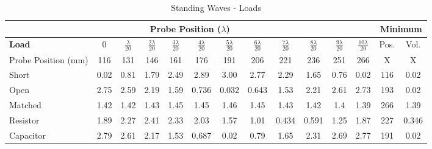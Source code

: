 \documentclass{article}
\begin{document}
\begin{table}[h]
	\begin{tabular}{|l|c|c|c|c|c|c|c|c|c|c|c|c|c|}
	\hline
	\multicolumn{12}{|c|}{\textbf{Probe Position ($\lambda$)}}                                                               	& \multicolumn{2}{c|}{\textbf{Minimum}} \\ \hline
	\textbf{Load}       & 0    & $\frac{\lambda}{20}$    & $\frac{2\lambda}{20}$    & $\frac{3\lambda}{20}$    & $\frac{4\lambda}{20}$     & $\frac{5\lambda}{20}$     & $\frac{6\lambda}{20}$     & $\frac{7\lambda}{20}$    & $\frac{8\lambda}{20}$    & $\frac{9\lambda}{20}$    & $\frac{10\lambda}{20}$   & Pos.         & Vol.          \\ \hline
	Probe Position (mm) & 116  & 131  & 146  & 161  & 176   & 191   & 206   & 221  & 236  & 251  & 266  & X            & X             \\ \hline
	Short               & 0.02 & 0.81 & 1.79 & 2.49 & 2.89  & 3.00  & 2.77  & 2.29 & 1.65 & 0.76 & 0.02 & 116          & 0.02          \\ \hline
	Open                & 2.75 & 2.59 & 2.19 & 1.59 & 0.736 & 0.032 & 0.643 & 1.53 & 2.21 & 2.61 & 2.73 & 193          & 0.02          \\ \hline
	Matched             & 1.42 & 1.42 & 1.43 & 1.45 & 1.45  & 1.46  & 1.45  & 1.43 & 1.42 & 1.4  & 1.39 & 266          & 1.39          \\ \hline
	Resistor            & 1.89 & 2.27 & 2.41 & 2.33 & 2.03  & 1.57  & 1.01  & 0.434& 0.591& 1.25 & 1.87 & 227          & 0.346         \\ \hline
	Capacitor           & 2.79 & 2.61 & 2.17 & 1.53 & 0.687 & 0.02  & 0.79  & 1.65 & 2.31 & 2.69 & 2.77 & 191          & 0.02          \\ \hline
	\end{tabular}
	\caption{Standing Waves - Loads}
	\label{}
\end{table}
\end{document}
